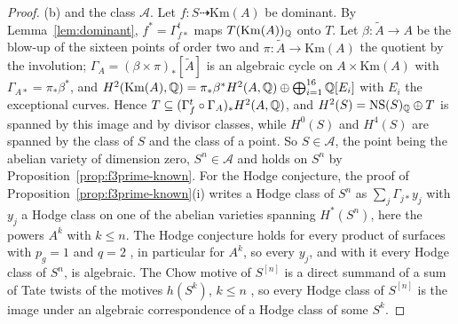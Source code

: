 \begin{proof}
(b) and the class $\mathcal{A}$. Let $f\colon S\dashrightarrow\mathrm{Km}(A)$ be dominant. By Lemma~\ref{lem:dominant}, $f^{*}=\Gamma_{f*}^{t}$ maps $T(\mathrm{Km}(A))_{\mathbb{Q}}$ onto $T$. Let $\beta\colon\tilde A\to A$ be the blow-up of the sixteen points of order two and $\pi\colon\tilde A\to\mathrm{Km}(A)$ the quotient by the involution; $\Gamma_{A}=(\beta\times\pi)_{*}[\tilde A]$ is an algebraic cycle on $A\times\mathrm{Km}(A)$ with $\Gamma_{A*}=\pi_{*}\beta^{*}$, and $H^{2}(\mathrm{Km}(A),\mathbb{Q})=\pi_{*}\beta^{*}H^{2}(A,\mathbb{Q})\oplus\bigoplus_{i=1}^{16}\mathbb{Q}[E_{i}]$ with $E_{i}$ the exceptional curves. Hence $T\subseteq(\Gamma_{f}^{t}\circ\Gamma_{A})_{*}H^{2}(A,\mathbb{Q})$, and $H^{2}(S)=\mathrm{NS}(S)_{\mathbb{Q}}\oplus T$ is spanned by this image and by divisor classes, while $H^{0}(S)$ and $H^{4}(S)$ are spanned by the class of $S$ and the class of a point. So $S\in\mathcal{A}$, the point being the abelian variety of dimension zero, $S^{n}\in\mathcal{A}$ and \Fiii{} holds on $S^{n}$ by Proposition~\ref{prop:f3prime-known}. For the Hodge conjecture, the proof of Proposition~\ref{prop:f3prime-known}(i) writes a Hodge class of $S^{n}$ as $\sum_{j}\Gamma_{j*}y_{j}$ with $y_{j}$ a Hodge class on one of the abelian varieties spanning $H^{*}(S^{n})$, here the powers $A^{k}$ with $k\le n$. The Hodge conjecture holds for every product of surfaces with $p_{g}=1$ and $q=2$ \cite{RM08}, in particular for $A^{k}$, so every $y_{j}$, and with it every Hodge class of $S^{n}$, is algebraic. The Chow motive of $S^{[n]}$ is a direct summand of a sum of Tate twists of the motives $h(S^{k})$, $k\le n$ \cite{dCM02}, so every Hodge class of $S^{[n]}$ is the image under an algebraic correspondence of a Hodge class of some $S^{k}$.
\end{proof}

